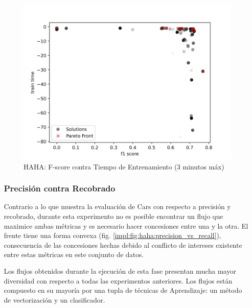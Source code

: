 \begin{figure}[ht]
    \centering
    \includegraphics[scale=0.65]{Pictures/haha_fscore_vs_time_3min.jpg}
    \caption{HAHA: F-score contra Tiempo de Entrenamiento (3 minutos m\'ax)}
    \label{impl:fig:haha:fscore_vs_time_3min}
\end{figure}

\subsubsection{Precisi\'on contra Recobrado}
Contrario a lo que muestra la evaluaci\'on de Cars con respecto a precisi\'on y recobrado, durante esta experimento no es posible encontrar un flujo que maximice ambas m\'etricas y es necesario hacer concesiones entre una y la otra. El frente tiene una forma convexa (fig. \ref{impl:fig:haha:precision_vs_recall}), consecuencia de las concesiones hechas debido al conflicto de intereses existente entre estas m\'etricas en este conjunto de datos.

Los flujos obtenidos durante la ejecuci\'on de esta fase presentan mucha mayor diversidad con respecto a todas las experimentos anteriores. Los flujos est\'an compuesto en su mayor\'ia por una tupla de t\'ecnicas de Aprendizaje: un m\'etodo de vectorizaci\'on y un clasificador.

